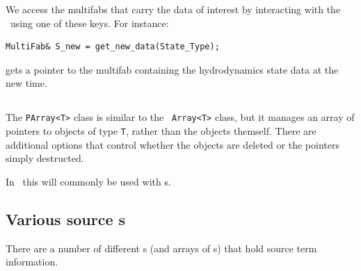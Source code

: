 We access the multifabs that carry the data of interest by interacting
with the \statedata\ using one of these keys.  For instance:
\begin{lstlisting}
MultiFab& S_new = get_new_data(State_Type);
\end{lstlisting}
gets a pointer to the multifab containing the hydrodynamics state data
at the new time.



\subsection{\code{\parray}}

The {\tt PArray<T>} class is similar to the \cpp\ {\tt Array<T>} class,
but it manages an array of pointers to objects of type {\tt T}, rather
than the objects themself.  There are additional options that control
whether the objects are deleted or the pointers simply destructed.

In \castro\, this will commonly be used with \multifab s.


\subsection{Various source \multifab s}

There are a number of different \multifab s (and arrays of \multifab s)
that hold source term information.

